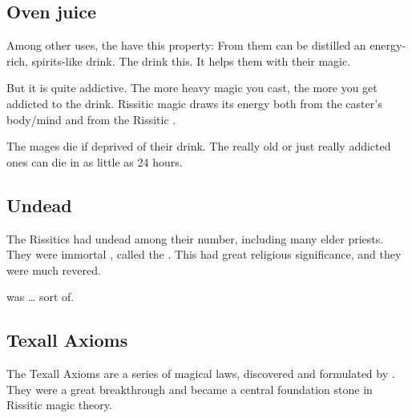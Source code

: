 \subsection{Oven juice}
Among other uses, the  have this property: 
From them can be distilled an energy-rich, spirits-like drink. 
The \nyzlet{} drink this. 
It helps them with their magic. 

But it is quite addictive. 
The more heavy magic you cast, the more you get addicted to the drink. 
Rissitic magic draws its energy both from the caster's body/mind and from the Rissitic \matrix. 

The mages die if deprived of their drink. 
The really old or just really addicted ones can die in as little as 24 hours. 









\subsection{Undead}
\index{\XulGann}
The Rissitics had undead among their number, including many elder priests. 
They were immortal , called the \XulGann.  
This had great religious significance, and they were much revered. 

 was \ldots{} sort of. 










\subsection{Texall Axioms}
The Texall Axioms are a series of magical laws, discovered and formulated by . 
They were a great breakthrough and became a central foundation stone in Rissitic magic theory. 
















